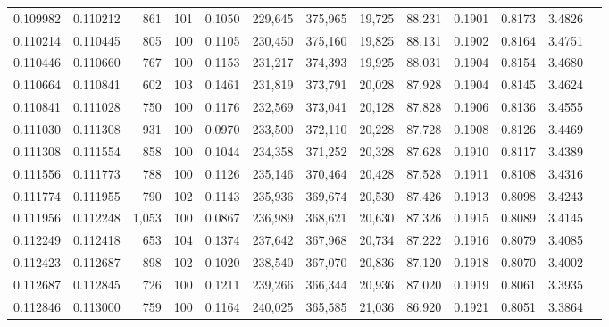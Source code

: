 \begin{tabular}{rrrrrrrrrrrrr}
0.109982 & 0.110212 &   861 & 101 &                                     0.1050 & 229,645 & 375,965 &  19,725 &  88,231 & 0.1901 & 0.8173 & 3.4826 \\
0.110214 & 0.110445 &   805 & 100 &                                     0.1105 & 230,450 & 375,160 &  19,825 &  88,131 & 0.1902 & 0.8164 & 3.4751 \\
0.110446 & 0.110660 &   767 & 100 &                                     0.1153 & 231,217 & 374,393 &  19,925 &  88,031 & 0.1904 & 0.8154 & 3.4680 \\
0.110664 & 0.110841 &   602 & 103 &                                     0.1461 & 231,819 & 373,791 &  20,028 &  87,928 & 0.1904 & 0.8145 & 3.4624 \\
0.110841 & 0.111028 &   750 & 100 &                                     0.1176 & 232,569 & 373,041 &  20,128 &  87,828 & 0.1906 & 0.8136 & 3.4555 \\
0.111030 & 0.111308 &   931 & 100 &                                     0.0970 & 233,500 & 372,110 &  20,228 &  87,728 & 0.1908 & 0.8126 & 3.4469 \\
0.111308 & 0.111554 &   858 & 100 &                                     0.1044 & 234,358 & 371,252 &  20,328 &  87,628 & 0.1910 & 0.8117 & 3.4389 \\
0.111556 & 0.111773 &   788 & 100 &                                     0.1126 & 235,146 & 370,464 &  20,428 &  87,528 & 0.1911 & 0.8108 & 3.4316 \\
0.111774 & 0.111955 &   790 & 102 &                                     0.1143 & 235,936 & 369,674 &  20,530 &  87,426 & 0.1913 & 0.8098 & 3.4243 \\
0.111956 & 0.112248 & 1,053 & 100 &                                     0.0867 & 236,989 & 368,621 &  20,630 &  87,326 & 0.1915 & 0.8089 & 3.4145 \\
0.112249 & 0.112418 &   653 & 104 &                                     0.1374 & 237,642 & 367,968 &  20,734 &  87,222 & 0.1916 & 0.8079 & 3.4085 \\
0.112423 & 0.112687 &   898 & 102 &                                     0.1020 & 238,540 & 367,070 &  20,836 &  87,120 & 0.1918 & 0.8070 & 3.4002 \\
0.112687 & 0.112845 &   726 & 100 &                                     0.1211 & 239,266 & 366,344 &  20,936 &  87,020 & 0.1919 & 0.8061 & 3.3935 \\
0.112846 & 0.113000 &   759 & 100 &                                     0.1164 & 240,025 & 365,585 &  21,036 &  86,920 & 0.1921 & 0.8051 & 3.3864 \\

\end{tabular}
